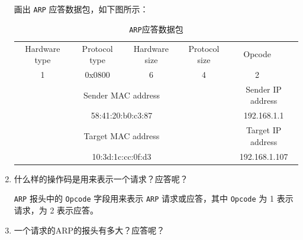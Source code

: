 \documentclass{article}
\begin{document}
\begin{enumerate}[noitemsep]
        画出 \texttt{ARP} 应答数据包，如下图所示：

        \begin{table}[H]
          \centering
          \begin{tabularx}{0.78\textwidth}{|*{10}{X|}}
            \hline
            \multicolumn{2}{|c|}{Hardware type}      & \multicolumn{2}{c|}{Protocol type}     & \multicolumn{1}{c|}{Hardware size} & \multicolumn{1}{c|}{Protocol size} & \multicolumn{2}{c|}{Opcode} & \multicolumn{2}{c|}{} \\
            \multicolumn{2}{|c|}{1}                  & \multicolumn{2}{c|}{0x0800}            & \multicolumn{1}{c|}{6}             & \multicolumn{1}{c|}{4}             & \multicolumn{2}{c|}{2}      & \multicolumn{2}{c|}{} \\
            \hline
            \multicolumn{6}{|c|}{Sender MAC address} & \multicolumn{4}{c|}{Sender IP address}                                                                                                                                 \\
            \multicolumn{6}{|c|}{58:41:20:b0:c3:87}  & \multicolumn{4}{c|}{192.168.1.1}                                                                                                                                       \\
            \hline
            \multicolumn{6}{|c|}{Target MAC address} & \multicolumn{4}{c|}{Target IP address}                                                                                                                                 \\
            \multicolumn{6}{|c|}{10:3d:1c:cc:0f:d3}  & \multicolumn{4}{c|}{192.168.1.107}                                                                                                                                     \\
            \hline
          \end{tabularx}
          \caption{\texttt{ARP}应答数据包}
        \end{table}


  \item 什么样的操作码是用来表示一个请求？应答呢？

        \texttt{ARP} 报头中的 \texttt{Opcode} 字段用来表示 \texttt{ARP} 请求或应答，其中 \texttt{Opcode} 为 1 表示请求，为 2 表示应答。

  \item 一个请求的ARP的报头有多大？应答呢？


\end{enumerate}
\end{document}
